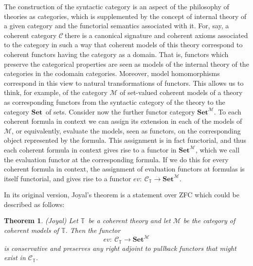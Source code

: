 \documentclass[a4paper,11pt]{article}
\theoremstyle{plain}
\newtheorem{thm}{Theorem}[subsection]
\theoremstyle{plain}
\theoremstyle{remark}
\newcommand{\cat}[1]{\ensuremath{\mathcal{#1}}}
\newcommand{\synt}[2]{\ensuremath{\mathcal{#1}_{{#2}}}}
\newcommand{\Sets}{\ensuremath{\mathbf{Set}}}
\newcommand{\theory}{\ensuremath{\mathbb{T}}}
\begin{document}
The construction of the syntactic category is an aspect of the philosophy of theories as categories, which is supplemented by the concept of internal theory of a given category and the functorial semantics associated with it. For, say, a coherent category \synt{C}\ there is a canonical signature and coherent axioms associated to the category in such a way that coherent models of this theory correspond to coherent functors having the category as a domain. That is, functors which preserve the categorical properties are seen as models of the internal theory of the categories in the codomain categories. Moreover, model homomorphisms correspond in this view to natural transformations of functors. This allows us to think, for example, of the category $\cat{M}$ of set-valued coherent models of a theory as corresponding functors from the syntactic category of the theory to the category \Sets\ of sets. Consider now the further functor category $\Sets^{\cat{M}}$. To each coherent formula in context we can assign its extension in each of the models of $\cat{M}$, or equivalently, evaluate the models, seen as functors, on the corresponding object represented by the formula. This assignment is in fact functorial, and thus each coherent formula in context gives rise to a functor in $\Sets^{\cat{M}}$, which we call the evaluation functor at the corresponding formula. If we do this for every coherent formula in context, the assignment of evaluation functors at formulas is itself functorial, and gives rise to a functor $ev :\ \synt{C}{\theory}\to \Sets^{\cat{M}}$. 

In its original version, Joyal's theorem is a statement over ZFC which could be described as follows:

\begin{thm}\label{joyal}(Joyal)
Let \theory\ be a coherent theory and let $\cat{M}$ be the category of coherent models of $\theory$. Then the functor
%
\[ev :\ \synt{C}{\theory}\to \Sets^{\cat{M}}\]
%
is conservative and preserves any right adjoint to pullback functors that might exist in $\synt{C}{\theory}$.
\end{thm}
\end{document}
